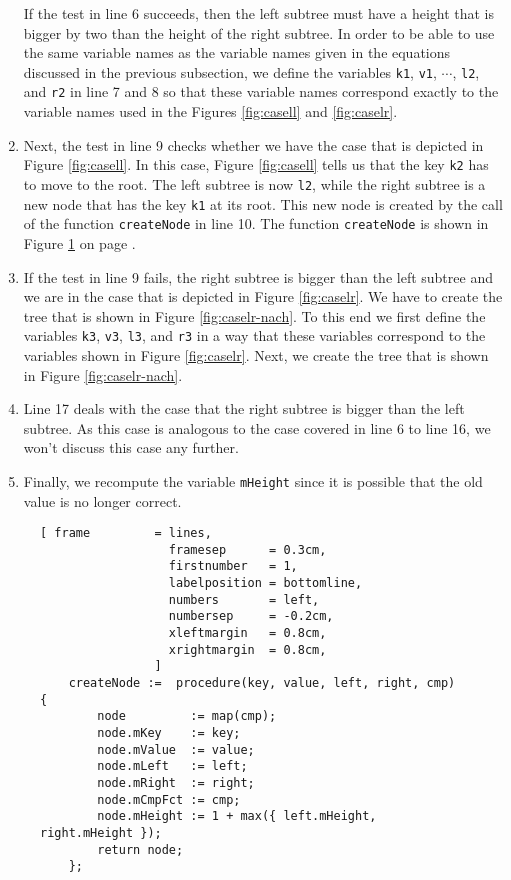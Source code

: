 \begin{enumerate}
      If the test in line 6 succeeds, then the left subtree must have a height that is bigger by
      two than the height of the right subtree.  In order to be able to use the same variable names 
      as the variable names given in the equations discussed in the previous subsection, we define
      the variables \texttt{k1}, \texttt{v1}, $\cdots$, \texttt{l2}, and \texttt{r2} in line 7 and 8
      so that these variable names correspond exactly to the variable names used in the Figures
      \ref{fig:casell} and \ref{fig:caselr}.
\item Next, the test in line 9 checks whether we have the case that is depicted in Figure
      \ref{fig:casell}.  In this case, Figure \ref{fig:casell} tells us that the key \texttt{k2}
      has to move to the root.  The left subtree is now \texttt{l2}, while the right subtree is a
      new node that has the key \texttt{k1} at its root.  This new node is created by the call
      of the function \texttt{createNode} in line 10.  The function \texttt{createNode} is shown in
      Figure \ref{fig:avl-tree.stlx:createNode} on page \pageref{fig:avl-tree.stlx:createNode}.
\item If the test in line 9 fails, the right subtree is bigger than the left subtree and we are in 
      the case that is depicted in Figure \ref{fig:caselr}.  We have to create the tree that is
      shown in Figure \ref{fig:caselr-nach}.  To this end we first define the variables 
      \texttt{k3}, \texttt{v3}, \texttt{l3}, and \texttt{r3} in a way that these variables
      correspond to the variables shown in Figure \ref{fig:caselr}.  Next, we create the tree
      that is shown in Figure \ref{fig:caselr-nach}.
\item Line 17 deals with the case that the right subtree is bigger than the left subtree. 
      As this case is analogous to the case covered in line 6 to line 16, we won't discuss this case
      any further.
\item Finally, we recompute the variable \texttt{mHeight} since it is possible that the old value is
      no longer correct.
\end{enumerate}


\begin{figure}[!ht]
\centering
\begin{Verbatim}[ frame         = lines, 
                  framesep      = 0.3cm, 
                  firstnumber   = 1,
                  labelposition = bottomline,
                  numbers       = left,
                  numbersep     = -0.2cm,
                  xleftmargin   = 0.8cm,
                  xrightmargin  = 0.8cm,
                ]
    createNode :=  procedure(key, value, left, right, cmp) {
        node         := map(cmp);
        node.mKey    := key;
        node.mValue  := value;
        node.mLeft   := left;
        node.mRight  := right;
        node.mCmpFct := cmp;
        node.mHeight := 1 + max({ left.mHeight, right.mHeight });
        return node;
    };
\end{Verbatim}
\vspace*{-0.3cm}
\caption{}
\label{fig:avl-tree.stlx:createNode}
\end{figure}

